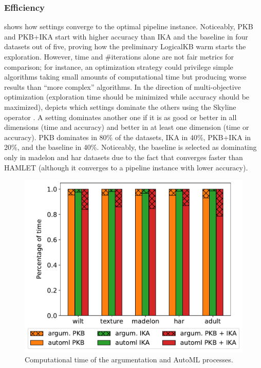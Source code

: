 \subsubsection{Efficiency}


 shows how settings converge to the optimal pipeline instance.
Noticeably, PKB and PKB+IKA start with higher accuracy than IKA and the baseline in four datasets out of five, proving how the preliminary LogicalKB warm starts the exploration.
However, time and \#iterations alone are not fair metrics for comparison; for instance, an optimization strategy could privilege simple algorithms taking small amounts of computational time but producing worse results than ``more complex'' algorithms.
In the direction of multi-objective optimization (exploration time should be minimized while accuracy should be maximized),  depicts which settings dominate the others using the Skyline operator \cite{borzsony2001skyline}.
A setting dominates another one if it is as good or better in all dimensions (time and accuracy) and better in at least one dimension (time or accuracy).
PKB dominates in 80\% of the datasets, IKA in 40\%, PKB+IKA in 20\%, and the baseline in 40\%.
Noticeably, the baseline is selected as dominating only in madelon and har datasets due to the fact that converges faster than HAMLET (although it converges to a pipeline instance with lower accuracy).


\begin{figure}[t]
    \centering
    \includegraphics[scale=.43]{chapters/part-automl/chapter-supervised/img-hamlet/time.pdf}
    \caption{Computational time of the argumentation and AutoML processes.}
    \label{fig:effoverhead}
\end{figure}


